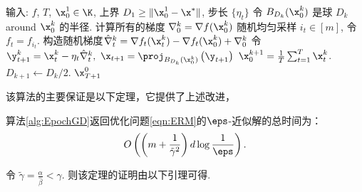 \begin{algorithm}[h!]
\caption{
    数据遍历GD
    }
\label{alg:EpochGD}
\begin{algorithmic}[1]
\STATE 输入: $f$, $T$, $\x_0^1 \in \K$, 上界 $D_1 \geq \|\x_0^1 - \x^* \|$, 步长 $\{\eta_t\}$ 
\STATE 令 $B_{D_k}(\x_0^k)$ 是球 $D_k$ around $\x_0^k$ 的半径.
\STATE 计算所有的梯度 $\nabla_0^k = \nabla f(\x_0^k) $
\STATE 随机均匀采样 $i_t \in [m]$, 令 $f_t = f_{i_t}$. 
\STATE \label{line:main-VR} 构造随机梯度$\hat{\nabla}_t^k =  \nabla f_t (\x_t^k) - \nabla  f_t (\x_0^k) + \nabla_0^k$
\STATE 令 $ \y_{t+1}^k = \x_{t}^k -\eta_t {\hat{\nabla}_t^k }    , \  \x_{t+1}= \proj_{B_{D_k}(\x_0^k)} \left( \y_{t+1}  \right) $
\ENDFOR
\STATE $\x_0^{k+1} = \frac{1}{T} \sum_{t=1}^T \x_t^k$.  $D_{k+1} \leftarrow D_k / 2$. 
\ENDFOR
\RETURN ${\x}_{T+1}^0 $ 
\end{algorithmic}
\end{algorithm}

该算法的主要保证是以下定理，它提供了上述改进，
\begin{theorem}
算法\ref{alg:EpochGD}返回优化问题\eqref{eqn:ERM}的$\eps$-近似解的总时间为：
$$ O\left( \left(m+ \frac{1}{\tilde{\gamma}^2} \right) d \log \frac{1}{\eps} \right) . $$
\end{theorem}

令 $\tilde{\gamma} = \frac{\alpha}{\hat{\beta}} < \gamma$. 则该定理的证明由以下引理可得. 

